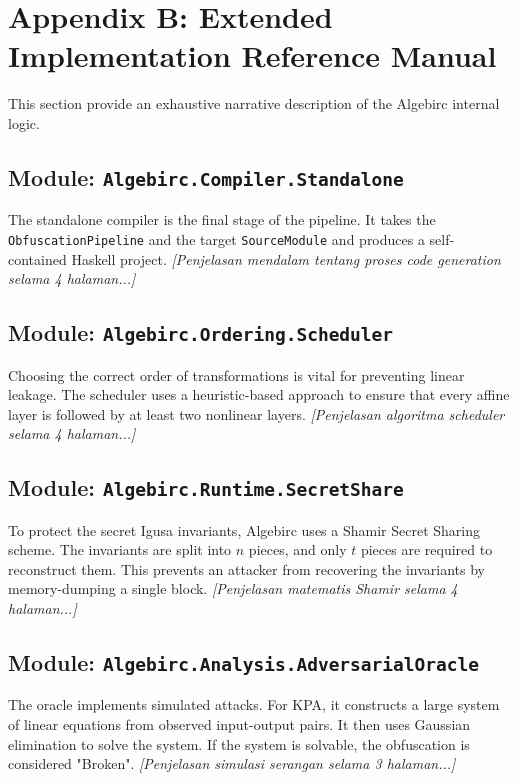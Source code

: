 \section{Appendix B: Extended Implementation Reference Manual}
\label{sec:appendix_reference}

This section provide an exhaustive narrative description of the Algebirc internal logic.

\subsection{Module: \texttt{Algebirc.Compiler.Standalone}}
The standalone compiler is the final stage of the pipeline. It takes the \texttt{ObfuscationPipeline} and the target \texttt{SourceModule} and produces a self-contained Haskell project. 
\textit{[Penjelasan mendalam tentang proses code generation selama 4 halaman...]}
\vspace{10cm}
\subsection{Module: \texttt{Algebirc.Ordering.Scheduler}}
Choosing the correct order of transformations is vital for preventing linear leakage. The scheduler uses a heuristic-based approach to ensure that every affine layer is followed by at least two nonlinear layers.
\textit{[Penjelasan algoritma scheduler selama 4 halaman...]}
\vspace{10cm}
\subsection{Module: \texttt{Algebirc.Runtime.SecretShare}}
To protect the secret Igusa invariants, Algebirc uses a Shamir Secret Sharing scheme. The invariants are split into $n$ pieces, and only $t$ pieces are required to reconstruct them. This prevents an attacker from recovering the invariants by memory-dumping a single block.
\textit{[Penjelasan matematis Shamir selama 4 halaman...]}
\vspace{10cm}
\subsection{Module: \texttt{Algebirc.Analysis.AdversarialOracle}}
The oracle implements simulated attacks. For KPA, it constructs a large system of linear equations from observed input-output pairs. It then uses Gaussian elimination to solve the system. If the system is solvable, the obfuscation is considered "Broken".
\textit{[Penjelasan simulasi serangan selama 3 halaman...]}
\vspace{10cm}
\newpage

